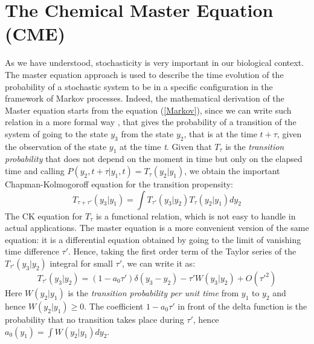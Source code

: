 \documentclass[12pt,a4paper]{report}
\begin{document}
\section{The Chemical Master Equation (CME)}\label{TheCMESection}
As we have understood, stochasticity is very important in our biological context. The master equation approach is used to describe the time evolution of the probability of a stochastic system to be in a specific configuration in the framework of Markov processes. Indeed, the mathematical derivation of the Master equation starts from the equation (\ref{Markov}), since we can write such relation in a more formal way \cite{PHD}, that gives the probability of a transition of the system of going to the state $y_{3}$ from the state $y_{2}$, that is at the time $t+\tau$, given the observation of the state $y_{1}$ at the time \emph{t}. Given that $T_{\tau}$ is the \emph{transition probability} that does not depend on the moment in time but only on the elapsed time and calling $P(y_{2}, t+\tau|y_{1},t) = T_{\tau}(y_{2}|y_{1})$, we obtain the important Chapman-Kolmogoroff equation for the transition propensity:
\begin{equation}
    T_{\tau+\tau'}(y_{3}|y_{1}) = \int T_{\tau'}(y_{3}|y_{2})T_{\tau}(y_{2}|y_{1})dy_{2}
\end{equation}
The CK equation for $T_{\tau}$ is a functional relation, which is not easy to handle in actual applications. The master equation is a more convenient version of the same equation: it is a differential equation obtained by going to the limit of vanishing time difference $\tau'$. Hence, taking the first order term of the Taylor series of the $T_{\tau'}(y_{3}|y_{2})$ integral for small $\tau'$, we can write it as:
\begin{equation}
    T_{\tau'}(y_{3}|y_{2}) = (1-a_{0}\tau')\delta(y_{3}-y_{2}) - \tau'W(y_{3}|y_{2}) + O(\tau'^{2})
\end{equation}
Here $W(y_{2}|y_{1})$ is the \emph{transition probability per unit time} from $y_{1}$ to $y_{2}$ and hence $W(y_{2}|y_{1})\geq0$. The coefficient $1-a_{0}\tau'$ in front of the delta function is the probability that no transition takes place during $\tau'$, hence $a_{0}(y_{1})=\int W(y_{2}|y_{1}) dy_{2}$.
\end{document}
